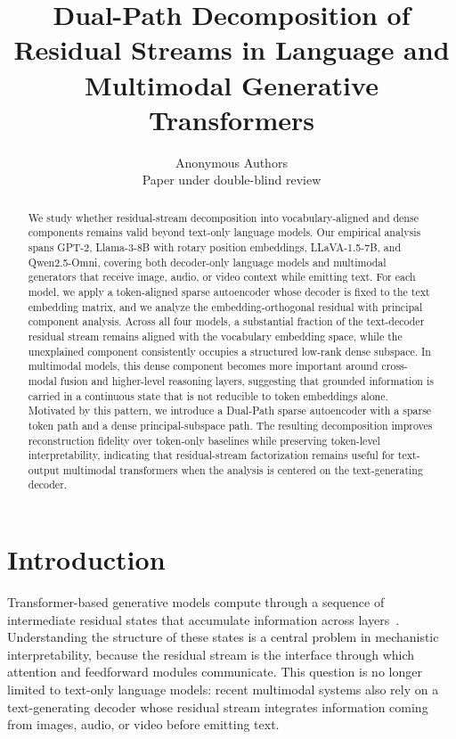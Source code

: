 \documentclass{article}
\title{Dual-Path Decomposition of Residual Streams in Language and Multimodal Generative Transformers}
\author{%
  Anonymous Authors \\
  Paper under double-blind review
}
\begin{document}
\maketitle


\begin{abstract}
  We study whether residual-stream decomposition into vocabulary-aligned and dense components remains valid beyond text-only language models. Our empirical analysis spans GPT-2, Llama-3-8B with rotary position embeddings, LLaVA-1.5-7B, and Qwen2.5-Omni, covering both decoder-only language models and multimodal generators that receive image, audio, or video context while emitting text. For each model, we apply a token-aligned sparse autoencoder whose decoder is fixed to the text embedding matrix, and we analyze the embedding-orthogonal residual with principal component analysis. Across all four models, a substantial fraction of the text-decoder residual stream remains aligned with the vocabulary embedding space, while the unexplained component consistently occupies a structured low-rank dense subspace. In multimodal models, this dense component becomes more important around cross-modal fusion and higher-level reasoning layers, suggesting that grounded information is carried in a continuous state that is not reducible to token embeddings alone. Motivated by this pattern, we introduce a Dual-Path sparse autoencoder with a sparse token path and a dense principal-subspace path. The resulting decomposition improves reconstruction fidelity over token-only baselines while preserving token-level interpretability, indicating that residual-stream factorization remains useful for text-output multimodal transformers when the analysis is centered on the text-generating decoder.
\end{abstract}



\section{Introduction}

Transformer-based generative models compute through a sequence of intermediate residual states that accumulate information across layers~\cite{vaswaniAttentionAllYou2017,gevaTransformerFeedForwardLayers2021}. Understanding the structure of these states is a central problem in mechanistic interpretability, because the residual stream is the interface through which attention and feedforward modules communicate. This question is no longer limited to text-only language models: recent multimodal systems also rely on a text-generating decoder whose residual stream integrates information coming from images, audio, or video before emitting text.
\end{document}
